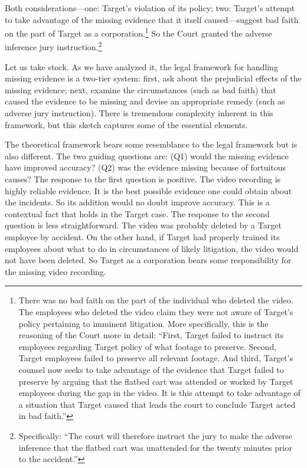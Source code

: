\documentclass[
  10pt,
  dvipsnames,enabledeprecatedfontcommands]{scrartcl}
\begin{document}
\noindent Both considerations---one: Target's violation of its policy;
two: Target's attempt to take advantage of the missing evidence that it
itself caused---suggest bad faith on the part of Target as a
corporation.\footnote{There was no bad faith on the part of the
  individual who deleted the video. The employees who deleted the video
  claim they were not aware of Target's policy pertaining to imminent
  litigation. More specifically, this is the reasoning of the Court more
  in detail: ``First, Target failed to instruct its employees regarding
  Target policy of what footage to preserve. Second, Target employees
  failed to preserve all relevant footage. And third, Target's counsel
  now seeks to take advantage of the evidence that Target failed to
  preserve by arguing that the flatbed cart was attended or worked by
  Target employees during the gap in the video. It is this attempt to
  take advantage of a situation that Target caused that leads the court
  to conclude Target acted in bad faith.''} So the Court granted the
adverse inference jury instruction.\footnote{ Specifically: ``The court
  will therefore instruct the jury to make the adverse inference that
  the flatbed cart was unattended for the twenty minutes prior to the
  accident.''}

\vspace{4mm}

\noindent Let us take stock. As we have analyzed it, the legal framework
for handling missing evidence is a two-tier system: first, ask about the
prejudicial effects of the missing evidence; next, examine the
circumstances (such as bad faith) that caused the evidence to be missing
and devise an appropriate remedy (such as adverse jury instruction).
There is tremendous complexity inherent in this framework, but this
sketch captures some of the essential elements.

The theoretical framework bears some resemblance to the legal framework
but is also different. The two guiding questions are: (Q1) would the
missing evidence have improved accuracy? (Q2) was the evidence missing
because of fortuitous causes? The response to the first question is
positive. The video recording is highly reliable evidence. It is the
best possible evidence one could obtain about the incidents. So its
addition would no doubt improve accuracy. This is a contextual fact that
holds in the Target case. The response to the second question is less
straightforward. The video was probably deleted by a Target employee by
accident. On the other hand, if Target had properly trained its
employees about what to do in circumstances of likely litigation, the
video would not have been deleted. So Target as a corporation bears some
responsibility for the missing video recording.
\end{document}
